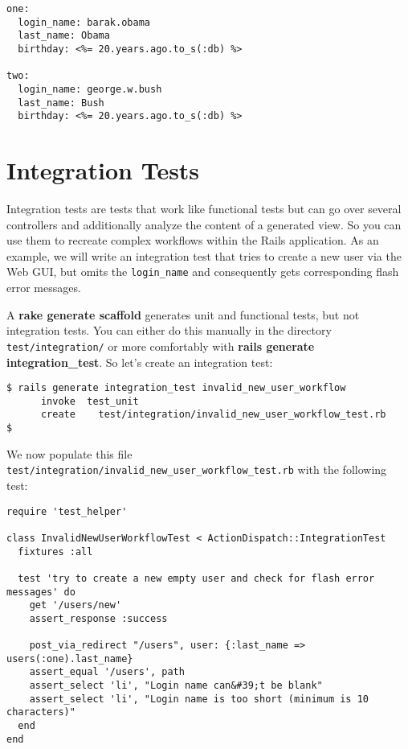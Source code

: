 \documentclass[a4paper]{book}
\newcounter{tab}[chapter]
\begin{document}
\begin{shaded}\begin{verbatim}
one:
  login_name: barak.obama
  last_name: Obama
  birthday: <%= 20.years.ago.to_s(:db) %>

two:
  login_name: george.w.bush
  last_name: Bush
  birthday: <%= 20.years.ago.to_s(:db) %>
\end{verbatim}\end{shaded}

\section{Integration Tests}\label{integration-tests}

Integration tests are tests that work like functional tests but can go over several controllers and additionally analyze the content of a generated view. So you can use them to recreate complex workflows within the Rails application. As an example, we will write an integration test that tries to create a new user via the Web GUI, but omits the \texttt{login\_name} and consequently gets corresponding flash error messages.

A \textbf{rake generate scaffold} generates unit and functional tests, but not integration tests. You can either do this manually in the directory \texttt{test/integration/} or more comfortably with \textbf{rails generate integration\_test}. So let's create an integration test:

\begin{shaded}\begin{verbatim}
$ rails generate integration_test invalid_new_user_workflow
      invoke  test_unit
      create    test/integration/invalid_new_user_workflow_test.rb
$
\end{verbatim}\end{shaded}

We now populate this file \texttt{test/integration/invalid\_new\_user\_workflow\_test.rb} with the following test:

\begin{shaded}\begin{verbatim}
require 'test_helper'

class InvalidNewUserWorkflowTest < ActionDispatch::IntegrationTest
  fixtures :all

  test 'try to create a new empty user and check for flash error messages' do
    get '/users/new'
    assert_response :success

    post_via_redirect "/users", user: {:last_name => users(:one).last_name}
    assert_equal '/users', path
    assert_select 'li', "Login name can&#39;t be blank"
    assert_select 'li', "Login name is too short (minimum is 10 characters)"
  end
end
\end{verbatim}\end{shaded}
\end{document}

